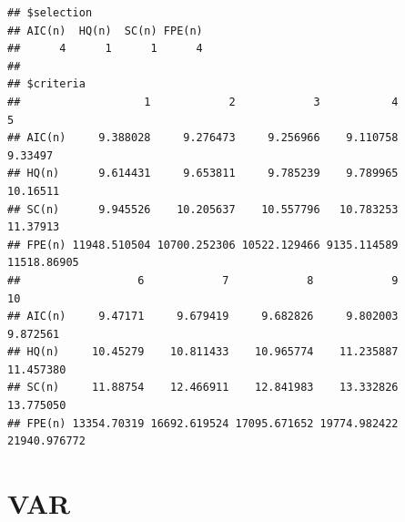 \documentclass[11pt,preprint, authoryear]{elsarticle}
\numberwithin{equation}{section}
\numberwithin{figure}{section}
\numberwithin{table}{section}
\begin{document}
\begin{verbatim}
## $selection
## AIC(n)  HQ(n)  SC(n) FPE(n) 
##      4      1      1      4 
## 
## $criteria
##                   1            2            3           4           5
## AIC(n)     9.388028     9.276473     9.256966    9.110758     9.33497
## HQ(n)      9.614431     9.653811     9.785239    9.789965    10.16511
## SC(n)      9.945526    10.205637    10.557796   10.783253    11.37913
## FPE(n) 11948.510504 10700.252306 10522.129466 9135.114589 11518.86905
##                  6            7            8            9           10
## AIC(n)     9.47171     9.679419     9.682826     9.802003     9.872561
## HQ(n)     10.45279    10.811433    10.965774    11.235887    11.457380
## SC(n)     11.88754    12.466911    12.841983    13.332826    13.775050
## FPE(n) 13354.70319 16692.619524 17095.671652 19774.982422 21940.976772
\end{verbatim}

\hypertarget{var}{%
\section{VAR}\label{var}}
\end{document}
